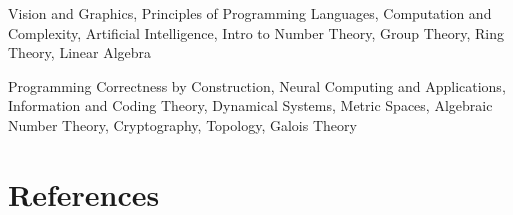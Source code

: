 \documentclass[a4paper]{cv}
\begin{document}
\begin{minipage}[t]{0.8\textwidth}
\begin{minipage}[t]{0.55\textwidth}
			Vision and Graphics,
			Principles of Programming Languages,
			Computation and Complexity,
			Artificial Intelligence,
			Intro to Number Theory,
			Group Theory,
			Ring Theory,
			Linear Algebra \\\vspace{4pt}
			
			Programming Correctness by Construction,
			Neural Computing and Applications,
			Information and Coding Theory,
			Dynamical Systems,
			Metric Spaces,
			Algebraic Number Theory,
			Cryptography,
			Topology,
			Galois Theory
			
		\end{minipage}
		
		\sectionspace %
		
		
		
		
		\section{References}\raggedright
		

\end{minipage}
\end{document}
